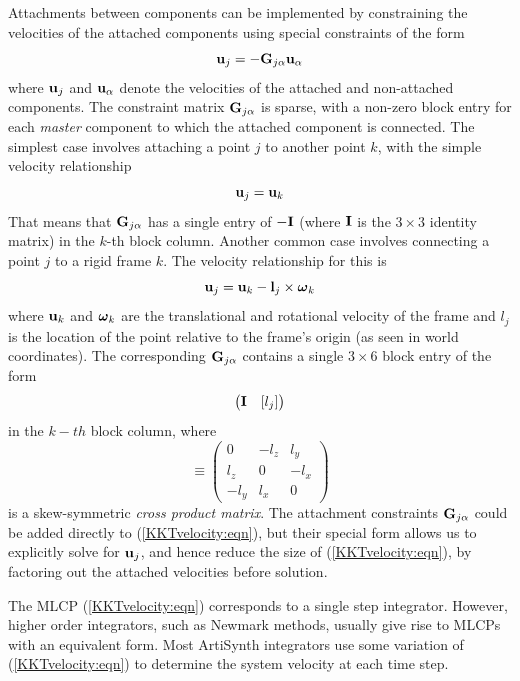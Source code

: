 Attachments between components can be implemented by constraining the
velocities of the attached components using special constraints of the
form
%
\begin{equation}
{\bf u}_j = -{\bf G}_{j\alpha} {\bf u}_\alpha
\label{attachments:eqn}
\end{equation}
%
where ${\bf u}_j$ and ${\bf u}_\alpha$ denote the velocities of the attached and
non-attached components. The constraint matrix ${\bf G}_{j\alpha}$ is
sparse, with a non-zero block entry for each {\it master} component to
which the attached component is connected. The simplest case involves
attaching a point $j$ to another point $k$, with the simple velocity relationship
%
\begin{equation}
{\bf u}_j = {\bf u}_k
\end{equation}
%
That means that ${\bf G}_{j\alpha}$ has a single entry of $-{\bf I}$ (where ${\bf I}$
is the $3 \times 3$ identity matrix) in the $k$-th block column.
Another common case involves connecting a point $j$ to
a rigid frame $k$. The velocity relationship for this is
%
\begin{equation}
{\bf u}_j = {\bf u}_k - {\bf l}_j \times \boldsymbol\omega_k
\end{equation}
%
where ${\bf u}_k$ and $\boldsymbol\omega_k$ are the translational and rotational
velocity of the frame and $l_j$ is the location of the point relative
to the frame's origin (as seen in world coordinates). The corresponding
${\bf G}_{j\alpha}$ contains a single $3 \times 6$ block entry of the form
%
\begin{equation}
\left(\begin{matrix}
{\bf I} & [ l_j ]
\end{matrix}\right)
\end{equation}
%
in the $k-th$ block column, where
%
\begin{equation}
[ l ] \equiv 
\left(\begin{matrix}
0 & -l_z & l_y \\
l_z & 0 & -l_x \\
-l_y & l_x & 0
\end{matrix}\right)
\end{equation}
%
is a skew-symmetric {\it cross product matrix}.
The attachment constraints ${\bf G}_{j\alpha}$ 
could be added directly to
(\ref{KKTvelocity:eqn}), but their special form allows us to
explicitly solve for ${\bf u}_j$, and hence reduce the size of
(\ref{KKTvelocity:eqn}), by factoring out the attached velocities
before solution.

The MLCP (\ref{KKTvelocity:eqn}) corresponds to a single step
integrator. However, higher order integrators, such as Newmark
methods, usually give rise to MLCPs with an equivalent form.  Most
ArtiSynth integrators use some variation of (\ref{KKTvelocity:eqn}) to
determine the system velocity at each time step.

